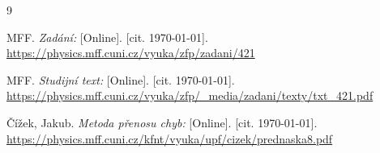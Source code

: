 
\begin{thebibliography}{9}

 MFF. \emph{Zadání:} [Online]. [cit. \today]. \newline \url{https://physics.mff.cuni.cz/vyuka/zfp/zadani/421}

 MFF. \emph{Studijní text:} [Online]. [cit. \today]. \newline \url{https://physics.mff.cuni.cz/vyuka/zfp/_media/zadani/texty/txt_421.pdf}

 Čížek, Jakub. \emph{Metoda přenosu chyb:} [Online]. [cit. \today]. \newline \url{https://physics.mff.cuni.cz/kfnt/vyuka/upf/cizek/prednaska8.pdf}

\end{thebibliography}
